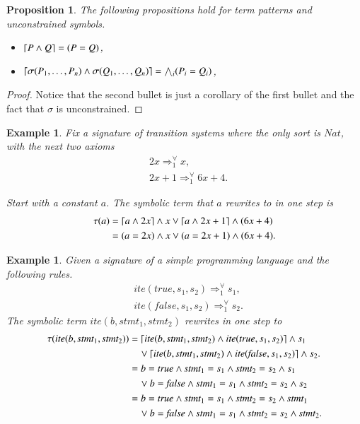 \documentclass{article}
\theoremstyle{plain}
\newtheorem{prop}[thm]{Proposition}
\newtheorem{eg}[thm]{Example}
\DeclarePairedDelimiter\ceil{\lceil}{\rceil}
\def\Nat{\textit{Nat}}
\def\ite{\textit{ite}}
\def\true{\textit{true}}
\def\false{\textit{false}}
\def\To1{\Rightarrow^{\forall}_1}
\begin{document}
\begin{prop}
	The following propositions hold for term patterns and unconstrained symbols.
	\begin{itemize}
		\item $\ceil{P \wedge Q} = (P = Q)$,
		\item $\ceil{\sigma(P_1,\dots,P_n) \wedge \sigma(Q_1,\dots,Q_n)} = \bigwedge_{i}(P_i = Q_i)$,
	\end{itemize}
\end{prop}
\begin{proof}
	Notice that the second bullet is just a corollary of the first bullet and the fact that $\sigma$ is unconstrained.
\end{proof}

\begin{eg}
	Fix a signature of transition systems where the only sort is $\Nat$, with the next two axioms
	\begin{align*}
	&2x \To1 x, \\
	&2x+1 \To1 6x+4.
	\end{align*}
	
	Start with a constant $a$. The symbolic term that $a$ rewrites to in one step is 
	\begin{align*}
	\tau(a) 
	&= \ceil{a \wedge 2x} \wedge x \vee
	          \ceil{a\wedge 2x + 1  } \wedge (6x + 4) \\
	&= (a = 2x) \wedge x \vee (a = 2x+1) \wedge (6x+4).  
	\end{align*}
\end{eg}

\begin{eg}
	Given a signature of a simple programming language and the following rules.
	\begin{align*}
	&\ite(\true, s_1, s_2) \To1 s_1,\\
	&\ite(\false, s_1, s_2) \To1 s_2.
	\end{align*}
	The symbolic term $\ite(b, \textit{stmt}_1, \textit{stmt}_2)$ rewrites in one step to
	\begin{align*}
	\tau(\ite(b, \textit{stmt}_1, \textit{stmt}_2))
	&= \ceil{\ite(b, \textit{stmt}_1, \textit{stmt}_2) \wedge \ite(\true, s_1, s_2)} \wedge s_1 \\
	&\quad \vee \ceil{\ite(b, \textit{stmt}_1, \textit{stmt}_2) \wedge \ite(\false, s_1, s_2)} \wedge s_2. \\
    &= b = \true \wedge \textit{stmt}_1 = s_1 \wedge \textit{stmt}_2 = s_2 \wedge s_1 \\
    &\quad \vee b = \false \wedge \textit{stmt}_1 = s_1 \wedge \textit{stmt}_2 = s_2 \wedge s_2\\
    &= b = \true \wedge \textit{stmt}_1 = s_1 \wedge \textit{stmt}_2 = s_2 \wedge \textit{stmt}_1 \\
    &\quad \vee b = \false \wedge \textit{stmt}_1 = s_1 \wedge \textit{stmt}_2 = s_2 \wedge \textit{stmt}_2.    
	\end{align*}
\end{eg}
\end{document}
